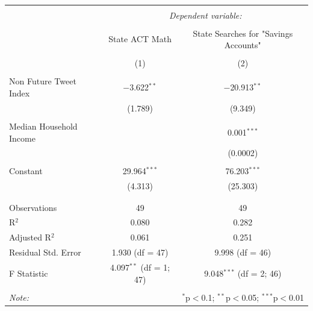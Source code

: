 \documentclass{article}
\begin{document}
\begin{table}[!htbp] \centering 
  \caption{} 
  \label{} 
\begin{tabular}{@{\extracolsep{5pt}}lcc} 
\\[-1.8ex]\hline 
\hline \\[-1.8ex] 
 & \multicolumn{2}{c}{\textit{Dependent variable:}} \\ 
\cline{2-3} 
\\[-1.8ex] & State ACT Math & State Searches for "Savings Accounts" \\ 
\\[-1.8ex] & (1) & (2)\\ 
\hline \\[-1.8ex] 
 Non Future Tweet Index & $-$3.622$^{**}$ & $-$20.913$^{**}$ \\ 
  & (1.789) & (9.349) \\ 
  & & \\ 
 Median Household Income &  & 0.001$^{***}$ \\ 
  &  & (0.0002) \\ 
  & & \\ 
 Constant & 29.964$^{***}$ & 76.203$^{***}$ \\ 
  & (4.313) & (25.303) \\ 
  & & \\ 
\hline \\[-1.8ex] 
Observations & 49 & 49 \\ 
R$^{2}$ & 0.080 & 0.282 \\ 
Adjusted R$^{2}$ & 0.061 & 0.251 \\ 
Residual Std. Error & 1.930 (df = 47) & 9.998 (df = 46) \\ 
F Statistic & 4.097$^{**}$ (df = 1; 47) & 9.048$^{***}$ (df = 2; 46) \\ 
\hline 
\hline \\[-1.8ex] 
\textit{Note:}  & \multicolumn{2}{r}{$^{*}$p$<$0.1; $^{**}$p$<$0.05; $^{***}$p$<$0.01} \\ 
\end{tabular} 
\end{table} 
\end{document}
